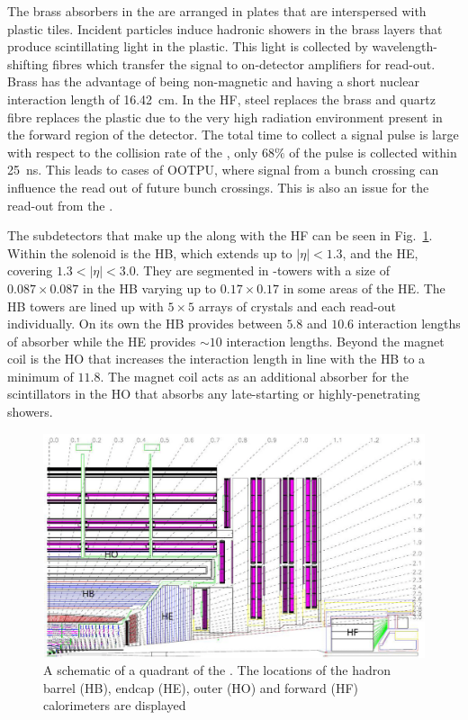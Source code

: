 The brass absorbers in the \HCAL are arranged in plates that are interspersed with
plastic tiles. Incident particles induce hadronic showers in the
brass layers that produce scintillating light in the plastic. This
light is collected by wavelength-shifting fibres which transfer the
signal to on-detector amplifiers for read-out. Brass has the advantage
of being non-magnetic and having a short nuclear interaction length
of 16.42~cm. In the \ac{HF}, steel replaces the brass and quartz fibre
replaces the plastic due to the very high radiation environment
present in the forward region of the detector. The total time to
collect a \HCAL signal pulse is large with respect to the collision
rate of the \LHC, only $68\%$ of the pulse is collected within 25~ns.
This leads to cases of \ac{OOTPU}, where signal from a bunch
crossing can influence the read out of future bunch crossings. This
is also an issue for the read-out from the \ECAL.

The subdetectors that make up the \HCAL along with the \ac{HF} can be
seen in Fig.~\ref{fig:hcal}. Within the solenoid is the \ac{HB},
which extends up to $|\eta|<1.3$, and the \ac{HE}, covering
$1.3<|\eta|<3.0$. They are segmented in \eta-\phi towers with a size
of $0.087\times0.087$ in the \ac{HB} varying up to $0.17\times0.17$ in
some areas of the \ac{HE}. The \ac{HB} towers are lined up with
$5\times5$ arrays of \ECAL crystals and each read-out individually. On
its own the \ac{HB} provides between $5.8$ and $10.6$ interaction
lengths of absorber while the \ac{HE} provides $\sim10$ interaction
lengths. Beyond the magnet coil is the \ac{HO} that increases the
interaction length in line with the \ac{HB} to a minimum of $11.8$.
The magnet coil acts as an additional absorber for the scintillators in the
\ac{HO} that absorbs any late-starting or highly-penetrating showers.

\begin{figure}
\begin{center}
\includegraphics[width=0.8\linewidth]{figs/cms_HCAL} \end{center}
\caption{ A schematic of a quadrant of the \CMS \HCAL. The locations of the hadron
barrel (HB), endcap (HE), outer (HO) and forward (HF) calorimeters are
displayed \cite{Chatrchyan:2008aa}}
\label{fig:hcal} \end{figure}

